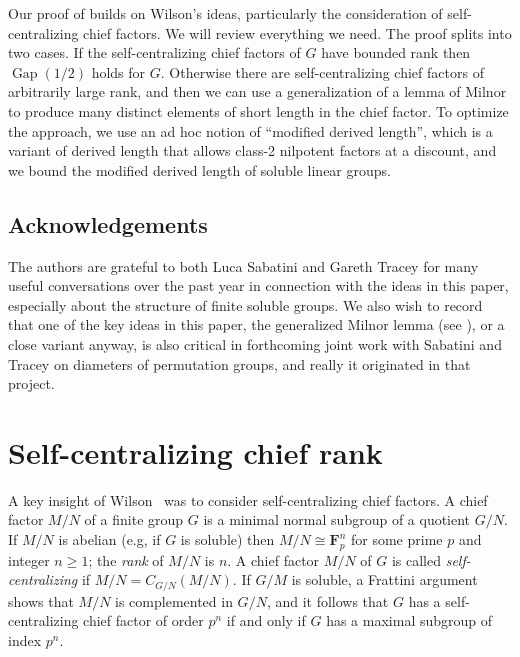 \documentclass[11pt,reqno]{amsart}
\numberwithin{equation}{section}
\theoremstyle{definition}
\theoremstyle{remark}
\def\F{\mathbf{F}}
\newcommand\opr[1]{\operatorname{#1}}
\def\Gap{\opr{Gap}}
\numberwithin{equation}{section}
\begin{document}
Our proof of  builds on Wilson's ideas,
particularly the consideration of self-centralizing chief factors.
We will review everything we need.
The proof splits into two cases.
If the self-centralizing chief factors of $G$ have bounded rank
then $\Gap(1/2)$ holds for $G$.
Otherwise there are self-centralizing chief factors of arbitrarily large rank, and then we can use a generalization of a lemma of Milnor to produce many distinct elements of short length in the chief factor.
To optimize the approach, we use an ad hoc notion of ``modified derived length'', which is a variant of derived length that allows class-2 nilpotent factors at a discount, and we bound the modified derived length of soluble linear groups.

\subsection*{Acknowledgements}

The authors are grateful to both Luca Sabatini and Gareth Tracey for many useful conversations over the past year in connection with the ideas in this paper, especially about the structure of finite soluble groups.
We also wish to record that one of the key ideas in this paper, the generalized Milnor lemma (see ), or a close variant anyway, is also critical in forthcoming joint work with Sabatini and Tracey on diameters of permutation groups, and really it originated in that project.


\section{Self-centralizing chief rank}

A key insight of Wilson~\cite{wilson2005} was to consider self-centralizing chief factors.
A chief factor $M / N$ of a finite group $G$ is a minimal normal subgroup of a quotient $G / N$.
If $M / N$ is abelian (e.g, if $G$ is soluble) then $M / N \cong \F_p^n$ for some prime $p$ and integer $n \ge 1$; the \emph{rank} of $M / N$ is $n$.
A chief factor $M / N$ of $G$ is called \emph{self-centralizing} if $M / N = C_{G/N}(M/N)$.
If $G / M$ is soluble, a Frattini argument shows that $M / N$ is complemented in $G / N$, and it follows that $G$ has a self-centralizing chief factor of order $p^n$ if and only if $G$ has a maximal subgroup of index $p^n$.
\end{document}
